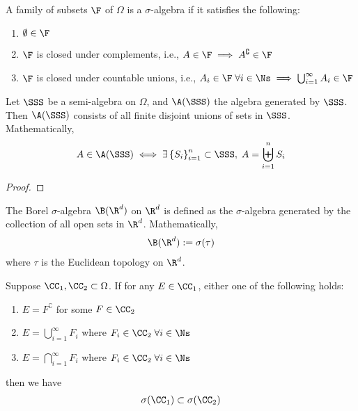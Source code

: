 \documentclass[thmcnt=section, 12pt]{elegantbook}
\begin{document}

\begin{definition}
    A family of subsets $\F$ of $\Omega$ is a $\sigma$-algebra  if it satisfies the following:
    \begin{enumerate}
        \item $\emptyset \in \F$
        \item $\F$ is closed under complements, i.e., $A \in \F \implies A^\complement \in \F$
        \item $\F$ is closed under countable unions, i.e., $A_i \in \F \; \forall i \in \Ns \implies \bigcup_{i=1}^\infty A_i \in \F $
    \end{enumerate}
\end{definition}


\begin{proposition} \label{pro:4}
    Let $\SSS$ be a semi-algebra on $\Omega$, and $\A(\SSS)$ the algebra generated by $\SSS$. Then $\A(\SSS)$ consists of all finite disjoint unions of sets in $\SSS$. Mathematically, 
    \begin{align*}
        A \in \A(\SSS)
        \iff 
        \exists \left\{S_i\right\}_{i=1}^n \subset \SSS, \; A = \biguplus_{i=1}^n S_i
    \end{align*}
\end{proposition}

\begin{proof}
\end{proof}


\begin{definition}
    The Borel $\sigma$-algebra $\B(\R^d)$ on $\R^d$ is defined as the $\sigma$-algebra generated by the collection of all open sets in $\R^d$. Mathematically, 
    \begin{align*}
        \B(\R^d) := \sigma(\tau)
    \end{align*}
    where $\tau$ is the Euclidean topology on $\R^d$.
\end{definition}


\begin{lemma}
    Suppose $\CC_1, \CC_2 \subset \Omega$. If for any $E \in \CC_1$, either one of the following holds:
    \begin{enumerate}
        \item $E = F^\complement$ for some $F \in \CC_2$
        \item $E = \bigcup_{i=1}^\infty F_i$ where $F_i \in \CC_2 \; \forall i \in \Ns$
        \item $E = \bigcap_{i=1}^\infty F_i$ where $F_i \in \CC_2 \; \forall i \in \Ns$
    \end{enumerate}
    then we have 
    \begin{align*}
        \sigma(\CC_1) \subset \sigma(\CC_2)
    \end{align*}
\end{lemma}
\end{document}
